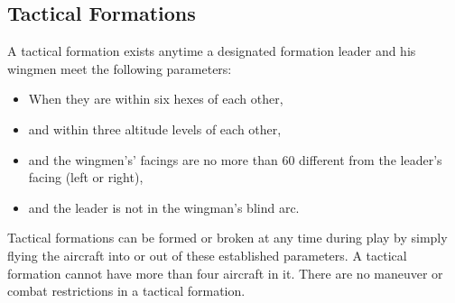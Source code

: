 \begin{advancedrules}
{\subsection{Tactical Formations}

A tactical formation exists anytime a designated formation leader and his wingmen meet the following parameters:

\begin{itemize}
    \item When they are within six hexes of each other,
    \item and within three altitude levels of each other,
    \item and the wingmen’s' facings are no more than 60{\deg} different from the leader's facing (left or right),
    \item and the leader is not in the wingman's blind arc.
\end{itemize}

Tactical formations can be formed or broken at any time during play by simply flying the aircraft into or out of these established parameters. A tactical formation cannot have more than four aircraft in it. There are no maneuver or combat restrictions in a tactical formation.
}

\end{advancedrules}